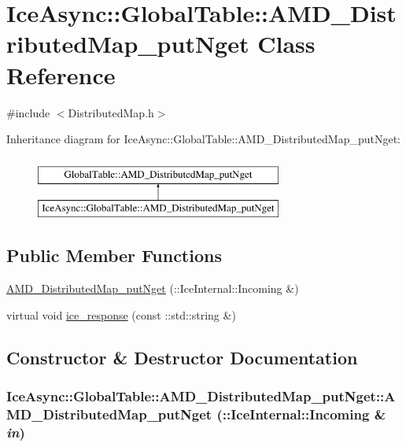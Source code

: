 \hypertarget{class_ice_async_1_1_global_table_1_1_a_m_d___distributed_map__put_nget}{
\section{IceAsync::GlobalTable::AMD\_\-DistributedMap\_\-putNget Class Reference}
\label{class_ice_async_1_1_global_table_1_1_a_m_d___distributed_map__put_nget}
}


{\ttfamily \#include $<$DistributedMap.h$>$}

Inheritance diagram for IceAsync::GlobalTable::AMD\_\-DistributedMap\_\-putNget:\begin{figure}[H]
\begin{center}
\leavevmode
\includegraphics[height=2cm]{class_ice_async_1_1_global_table_1_1_a_m_d___distributed_map__put_nget}
\end{center}
\end{figure}
\subsection*{Public Member Functions}
\begin{DoxyCompactItemize}
\item 
\hyperlink{class_ice_async_1_1_global_table_1_1_a_m_d___distributed_map__put_nget_a74d4ea0966f2673e56959916eb1db9e2}{AMD\_\-DistributedMap\_\-putNget} (::IceInternal::Incoming \&)
\item 
virtual void \hyperlink{class_ice_async_1_1_global_table_1_1_a_m_d___distributed_map__put_nget_ac8be69737e1c3604a144dbdeb6653b8d}{ice\_\-response} (const ::std::string \&)
\end{DoxyCompactItemize}


\subsection{Constructor \& Destructor Documentation}
\hypertarget{class_ice_async_1_1_global_table_1_1_a_m_d___distributed_map__put_nget_a74d4ea0966f2673e56959916eb1db9e2}{
\subsubsection[{AMD\_\-DistributedMap\_\-putNget}]{\setlength{\rightskip}{0pt plus 5cm}IceAsync::GlobalTable::AMD\_\-DistributedMap\_\-putNget::AMD\_\-DistributedMap\_\-putNget (::IceInternal::Incoming \& {\em in})}}
\label{class_ice_async_1_1_global_table_1_1_a_m_d___distributed_map__put_nget_a74d4ea0966f2673e56959916eb1db9e2}


